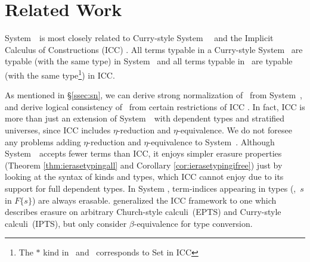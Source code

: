 \section{Related Work} \label{sec:relwork}
System~\Fi\ is most closely related to
Curry-style System~\Fw\ \cite{AbeMatUus05,GHR93}
and the Implicit Calculus of Constructions (ICC) \cite{Miquel01}.
All terms typable in a Curry-style System \Fw\ are typable (with the same type) in System \Fi\ 
and all terms typable in \Fi\ are typable (with the same type\footnote{The $*$ kind in \Fw\ and \Fi\ corresponds
        to \textsf{Set} in ICC}) in ICC.

As mentioned in \S\ref{ssec:sn}, we can derive strong normalization of \Fi\ 
from System~\Fw, and derive logical consistency of \Fi\ from certain
restrictions of ICC \cite{Miquel00,BarrasB08}.
In fact, ICC is more than just an extension of System~\Fi\ 
with dependent types and stratified universes, since ICC includes
$\eta$-reduction and $\eta$-equivalence.
We do not foresee any problems adding
$\eta$-reduction and $\eta$-equivalence to System~\Fi.
Although System~\Fi\ accepts fewer terms than ICC, it enjoys simpler
erasure properties (Theorem \ref{thm:ierasetypingall} and
Corollary \ref{cor:ierasetypingifree}) just by looking at the syntax
of kinds and types, which ICC cannot enjoy due to its support for
full dependent types.  In System \Fi, term-indices appearing in types
(\eg,~$s$ in $F\{s\}$) are always erasable.  \citet{LingerS08} generalized the ICC framework to one which describes
erasure on arbitrary Church-style calculi~(EPTS) and Curry-style
calculi~(IPTS), but only consider $\beta$-equivalence for type conversion.


